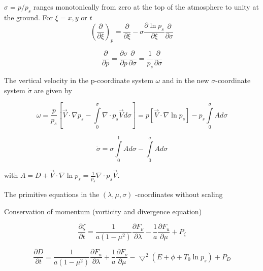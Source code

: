 $\sigma=p/p_s$ ranges monotonically from zero at 
the top of the atmosphere to unity at the ground. For $\xi=x,y $ or $t$
\begin{equation}
{\displaystyle (\frac{\partial }{\partial \xi})_p
=\frac{\partial }{\partial \xi}
-\sigma \frac{\partial \ln p_s}{\partial \xi}
\frac{\partial }{\partial \sigma}}
\end{equation}

\begin{equation}
\frac{\partial }{\partial p}
=\frac{\partial \sigma }{\partial p}
\frac{\partial }{\partial \sigma}
=\frac{1 }{p_s}
\frac{\partial }{\partial \sigma}
\end{equation}

The vertical velocity in the p-coordinate system $\omega$
and in the new $\sigma$-coordinate 
system $\dot {\sigma}$
are given by \cite{phillips1957}

\begin{equation}
\omega=  \frac{p}{p_s}
[\vec{V} \cdot  \nabla  p_s
 -  \int\limits_{0}^{\sigma} \nabla \cdot  p_s \vec{V} d \sigma]
=  p [\vec{V} \cdot  \nabla \ln p_s]
 - p_s \int\limits_{0}^{\sigma} A d \sigma
\end{equation}

\begin{equation}
\dot {\sigma}=  \sigma \int\limits_{0}^{1} A d \sigma
-  \int\limits_{0}^{\sigma} A d \sigma
\end{equation}

with $A=D+\vec{V} \cdot \nabla \ln p_s 
= \frac{1}{p_s} \nabla \cdot  p_s  \vec{V}$.





The primitive equations in the $(\lambda , \mu, \sigma)$ -coordinates
without scaling

Conservation of momentum (vorticity and divergence equation)

\begin{equation}
{\displaystyle \frac{\partial \zeta}{\partial t} = \frac{1}{a(1 - \mu^2)} \frac{\partial F_\nu}{\partial \lambda} - \frac{1}{a} \frac{\partial F_u}{\partial \mu} + P_\zeta}
\end{equation}

\begin{equation}
{\displaystyle \frac{\partial D}{\partial t} = \frac{1}{a (1 - \mu^2)} \frac{\partial F_u}{\partial \lambda} + \frac{1}{a} \frac{ \partial F_\nu}{\partial \mu} - \bigtriangledown^2 (E + \phi +T_0 \ln p_s) + P_D}
\end{equation}

